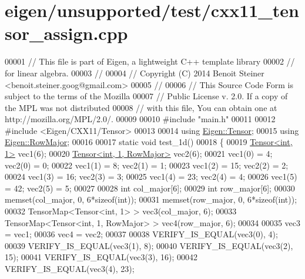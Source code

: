 \hypertarget{eigen_2unsupported_2test_2cxx11__tensor__assign_8cpp_source}{}\section{eigen/unsupported/test/cxx11\+\_\+tensor\+\_\+assign.cpp}
\label{eigen_2unsupported_2test_2cxx11__tensor__assign_8cpp_source}

\begin{DoxyCode}
00001 \textcolor{comment}{// This file is part of Eigen, a lightweight C++ template library}
00002 \textcolor{comment}{// for linear algebra.}
00003 \textcolor{comment}{//}
00004 \textcolor{comment}{// Copyright (C) 2014 Benoit Steiner <benoit.steiner.goog@gmail.com>}
00005 \textcolor{comment}{//}
00006 \textcolor{comment}{// This Source Code Form is subject to the terms of the Mozilla}
00007 \textcolor{comment}{// Public License v. 2.0. If a copy of the MPL was not distributed}
00008 \textcolor{comment}{// with this file, You can obtain one at http://mozilla.org/MPL/2.0/.}
00009 
00010 \textcolor{preprocessor}{#include "main.h"}
00011 
00012 \textcolor{preprocessor}{#include <Eigen/CXX11/Tensor>}
00013 
00014 \textcolor{keyword}{using} \hyperlink{class_eigen_1_1_tensor}{Eigen::Tensor};
00015 \textcolor{keyword}{using} \hyperlink{group__enums_ggaacded1a18ae58b0f554751f6cdf9eb13acfcde9cd8677c5f7caf6bd603666aae3}{Eigen::RowMajor};
00016 
00017 \textcolor{keyword}{static} \textcolor{keywordtype}{void} test\_1d()
00018 \{
00019   \hyperlink{class_eigen_1_1_tensor}{Tensor<int, 1>} vec1(6);
00020   \hyperlink{class_eigen_1_1_tensor}{Tensor<int, 1, RowMajor>} vec2(6);
00021   vec1(0) = 4;  vec2(0) = 0;
00022   vec1(1) = 8;  vec2(1) = 1;
00023   vec1(2) = 15; vec2(2) = 2;
00024   vec1(3) = 16; vec2(3) = 3;
00025   vec1(4) = 23; vec2(4) = 4;
00026   vec1(5) = 42; vec2(5) = 5;
00027 
00028   \textcolor{keywordtype}{int} col\_major[6];
00029   \textcolor{keywordtype}{int} row\_major[6];
00030   memset(col\_major, 0, 6*\textcolor{keyword}{sizeof}(\textcolor{keywordtype}{int}));
00031   memset(row\_major, 0, 6*\textcolor{keyword}{sizeof}(\textcolor{keywordtype}{int}));
00032   TensorMap<Tensor<int, 1> > vec3(col\_major, 6);
00033   TensorMap<Tensor<int, 1, RowMajor> > vec4(row\_major, 6);
00034 
00035   vec3 = vec1;
00036   vec4 = vec2;
00037 
00038   VERIFY\_IS\_EQUAL(vec3(0), 4);
00039   VERIFY\_IS\_EQUAL(vec3(1), 8);
00040   VERIFY\_IS\_EQUAL(vec3(2), 15);
00041   VERIFY\_IS\_EQUAL(vec3(3), 16);
00042   VERIFY\_IS\_EQUAL(vec3(4), 23);

\end{DoxyCode}
